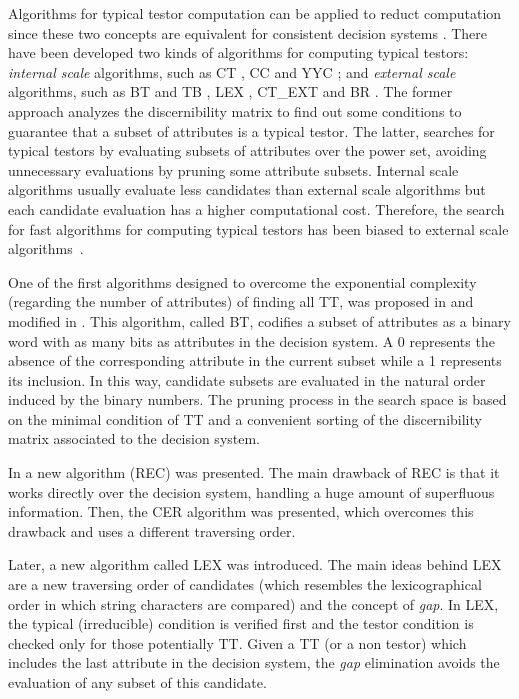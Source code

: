 \documentclass[number,preprint,review,12pt]{elsarticle}
\begin{document}
  Algorithms for typical testor computation can be applied to reduct computation since these two concepts are equivalent for consistent decision systems \citep{Lazo15}. There have been developed two kinds of algorithms for computing typical testors: \emph{internal scale} algorithms, such as CT \citep{Bravo83}, CC \citep{Aguila84} and YYC \citep{Alba14}; and \emph{external scale} algorithms, such as BT and TB \citep{Ruiz85}, LEX \citep{Santiesteban03}, CT\_EXT \citep{Sanchez07} and BR \citep{Lias09}. The former approach analyzes the discernibility matrix to find out some conditions to guarantee that a subset of attributes is a typical testor. The latter, searches for typical testors by evaluating subsets of attributes over the power set, avoiding unnecessary evaluations by pruning some attribute subsets. Internal scale algorithms usually evaluate less candidates than external scale algorithms but each candidate evaluation has a higher computational cost. Therefore, the search for fast algorithms for computing typical testors has been biased to external scale algorithms~\citep{Alba14}.
  
  One of the first algorithms designed to overcome the exponential complexity (regarding the number of attributes) of finding all TT, was proposed in \cite{Ruiz85} and modified in \cite{sanchez02}. This algorithm, called BT, codifies a subset of attributes as a binary word with as many bits as attributes in the decision system. A 0 represents the absence of the corresponding attribute in the current subset while a 1 represents its inclusion. In this way, candidate subsets are evaluated in the natural order induced by the binary numbers. The pruning process in the search space is based on the minimal condition of TT and a convenient sorting of the discernibility matrix associated to the decision system. 
  
  In \citep{Shulcloper95b} a new algorithm (REC) was presented. The main drawback of REC is that it works directly over the decision system, handling a huge amount of superfluous information. Then, the CER algorithm \cite{Ayaquica97} was presented, which overcomes this drawback and uses a different traversing order.  
  
  Later, a new algorithm called LEX \cite{Santiesteban03} was introduced. The main ideas behind LEX are a new traversing order of candidates (which resembles the lexicographical order in which string characters are compared) and the concept of \emph{gap}. In LEX, the typical (irreducible) condition is verified first and the testor condition is checked only for those potentially TT. Given a TT (or a non testor) which includes the last attribute in the decision system, the \emph{gap} elimination avoids the evaluation of any subset of this candidate. 
  
\end{document}

